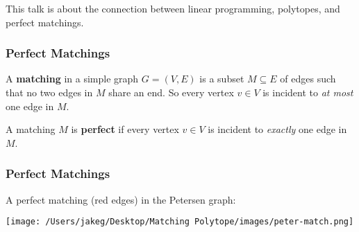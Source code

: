 \begin{frame}
\begin{center}
\Large This talk is about the connection between linear programming, polytopes, and perfect matchings.
\end{center}
\end{frame}

\begin{frame}
\frametitle{Perfect Matchings}
A \textbf{matching} in a simple graph \( G = (V,E) \) is a subset \( M \subseteq E \) of edges such that no two edges in \( M \) share an end. So every vertex \( v \in V \) is incident to \emph{at most} one edge in \( M \). \\

\vspace{0.3cm}

A matching \( M \) is \textbf{perfect} if every vertex \( v \in V \) is incident to \emph{exactly} one edge in \( M \). 
\end{frame}

\begin{frame}
\frametitle{Perfect Matchings}
A perfect matching (red edges) in the Petersen graph:
\begin{center}
\texttt{[image: /Users/jakeg/Desktop/Matching Polytope/images/peter-match.png]}
\end{center}
\end{frame}
